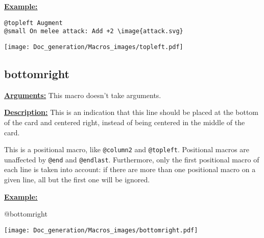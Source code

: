 \documentclass{article}
\begin{document}
\textbf{\underline{Example:}}

\begin{center}
\begin{BVerbatim}
@topleft Augment
@small On melee attack: Add +2 \image{attack.svg}
\end{BVerbatim}

\texttt{[image: Doc\_generation/Macros\_images/topleft.pdf]}
\end{center}


\subsection{bottomright}
\textbf{\underline{Arguments:}} This macro doesn't take arguments.

\textbf{\underline{Description:}} This is an indication that this line should be placed at the bottom of the card and centered right, instead of being centered in the middle of the card.

This is a positional macro, like \verb`@column2` and \verb`@topleft`. Positional macros are unaffected by \verb`@end` and \verb`@endlast`. Furthermore, only the first positional macro of each line is taken into account: if there are more than one positional macro on a given line, all but the first one will be ignored.

\textbf{\underline{Example:}}

\begin{minipage}{0.45\linewidth}
\raggedright
\begin{spverbatim}
@bottomright 
\end{spverbatim}
\end{minipage}
\begin{minipage}{0.45\linewidth}
\raggedleft
\texttt{[image: Doc\_generation/Macros\_images/bottomright.pdf]}
\end{minipage} 
\end{document}
